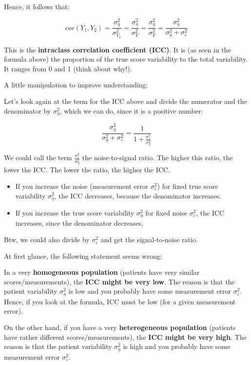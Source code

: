 \documentclass[
]{book}
\providecommand{\tightlist}{%
  \setlength{\itemsep}{0pt}\setlength{\parskip}{0pt}}
\begin{document}
Hence, it follows that:

\[cor(Y_1, Y_2) = \frac{\sigma_{\eta}^2}{\sigma_{Y_1}^2} = \frac{\sigma_{\eta}^2}{\sigma_{Y}^2} =  \frac{\sigma_{\eta}^2}{\sigma_{Y}^2} = \frac{\sigma_{\eta}^2}{\sigma_{\eta}^2 + \sigma_{\varepsilon}^2}\]

This is the \textbf{intraclass correlation coefficient (ICC)}.
It is (as seen in the formula above) the proportion of the
true score variability to the total variability.
It ranges from 0 and 1 (think about why!).

A little manipulation to improve understanding:

Let's look again at the term for the ICC above and divide the numerator and the denominator by
\(\sigma_{\eta}^2\), which we can do, since it is a positive number:

\[\frac{\sigma_{\eta}^2}{\sigma_{\eta}^2 + \sigma_{\varepsilon}^2} = \frac{1}{1 + \frac{\sigma_{\varepsilon}^2}{\sigma_{\eta}^2}}\]

We could call the term \(\frac{\sigma_{\varepsilon}^2}{\sigma_{\eta}^2}\) the noise-to-signal ratio.
The higher this ratio, the lower the ICC. The lower the ratio, the higher the ICC.

\begin{itemize}
\tightlist
\item
  If you increase the noise (measurement error \(\sigma_{\varepsilon}^2\)) for fixed
  true score variability \(\sigma_{\eta}^2\), the ICC decreases, because the denominator
  increases.
\item
  If you increase the true score variability \(\sigma_{\eta}^2\) for fixed noise \(\sigma_{\varepsilon}^2\),
  the ICC increases, since the denominator decreases.
\end{itemize}

Btw, we could also divide by \(\sigma_{\varepsilon}^2\) and get the signal-to-noise ratio.

At first glance, the following statement seems wrong:

In a very \textbf{homogeneous population} (patients have very similar scores/measurements),
the \textbf{ICC might be very low}. The reason is that the patient variability \(\sigma_{\eta}^2\) is low
and you probably have some measurement error \(\sigma_{\varepsilon}^2\).
Hence, if you look at the formula, ICC must be low (for a given measurement error).

On the other hand, if you have a very \textbf{heterogeneous population} (patients have rather different
scores/measurements), the \textbf{ICC might be very high}.
The reason is that the patient variability \(\sigma_{\eta}^2\) is high and you probably
have some measurement error \(\sigma_{\varepsilon}^2\).
\end{document}
